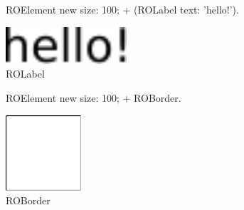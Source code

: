 \documentclass[a4paper,10pt,twoside]{book}
\begin{document}
\begin{figure}[H]
      \begin{minipage}[t]{0.5\textwidth}
      \vspace{0pt}
     \begin{code}
     
	ROElement new 
		size: 100; 
		+ (ROLabel text: 'hello!').	\end{code}
   \end{minipage}
   \hfill
   \begin{minipage}[t]{0.4\textwidth}
      \vspace{0pt} \raggedright
       \centering
		\includegraphics[width=0.4\textwidth]{label}
   \end{minipage}
\caption{ROLabel}
\label{fig:label}
\end{figure}

\begin{figure}[H]
      \begin{minipage}[t]{0.5\textwidth}
      \vspace{0pt}
     \begin{code}
     
	ROElement new 
		size: 100; 
		+ ROBorder.	\end{code}
   \end{minipage}
   \hfill
   \begin{minipage}[t]{0.4\textwidth}
      \vspace{0pt} \raggedright
       \centering
		\includegraphics[width=0.25\textwidth]{border}
   \end{minipage}
\caption{ROBorder}
\label{fig:border}
\end{figure}  
\end{document}
